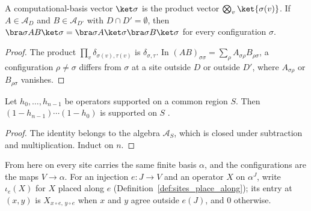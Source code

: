 \begin{lemma}
    \label{thm:ldp_offsupport_matrix_elements}
    \leanok
    A computational-basis vector $\ket\sigma$ is the product vector
    $\bigotimes_v\ket{\sigma(v)}$. If $A\in\mathcal A_D$ and
    $B\in\mathcal A_{D'}$ with $D\cap D'=\emptyset$, then
    $\bra\sigma AB\ket\sigma=\bra\sigma A\ket\sigma\bra\sigma B\ket\sigma$
    for every configuration $\sigma$.
\end{lemma}
\begin{proof}
    \leanok
    The product $\prod_v\delta_{\sigma(v),\tau(v)}$ is $\delta_{\sigma,\tau}$.
    In $(AB)_{\sigma\sigma}=\sum_\rho A_{\sigma\rho}B_{\rho\sigma}$, a
    configuration $\rho\neq\sigma$ differs from $\sigma$ at a site outside $D$
    or outside $D'$, where $A_{\sigma\rho}$ or $B_{\rho\sigma}$ vanishes.
\end{proof}

\begin{lemma}
    \label{thm:physical_complementary_product_support}
    \leanok
    Let $h_0,\ldots,h_{n-1}$ be operators supported on a common region $S$.
    Then $(1-h_{n-1})\cdots(1-h_0)$ is supported on $S$
    \cite[lines 1543--1568]{Arad2016RigorousRG}.
\end{lemma}
\begin{proof}
    \leanok
    The identity belongs to the algebra $\mathcal A_S$, which is closed under
    subtraction and multiplication. Induct on $n$.
\end{proof}

From here on every site carries the same finite basis $\alpha$, and the
configurations are the maps $V\to\alpha$. For an injection $e\colon J\to V$ and
an operator $X$ on $\alpha^J$, write $\iota_e(X)$ for $X$ placed along $e$
(Definition~\ref{def:sites_place_along}); its entry at $(x,y)$ is
$X_{x\circ e,\,y\circ e}$ when $x$ and $y$ agree outside $e(J)$, and $0$
otherwise.


